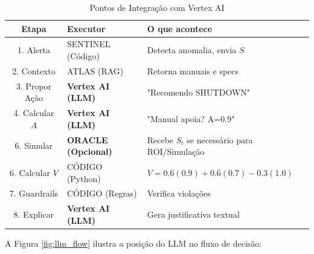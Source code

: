 \documentclass[12pt, a4paper]{article}
\begin{document}
\begin{table}[h!]
\centering
\small
\begin{tabular}{|c|l|l|}
\hline
\textbf{Etapa} & \textbf{Executor} & \textbf{O que acontece} \\ \hline
1. Alerta & SENTINEL (Código) & Detecta anomalia, envia $S$ \\ \hline
2. Contexto & ATLAS (RAG) & Retorna manuais e specs \\ \hline
3. Propor Ação & \textbf{Vertex AI (LLM)} & "Recomendo SHUTDOWN" \\ \hline
4. Calcular $A$ & \textbf{Vertex AI (LLM)} & "Manual apoia? A=0.9" \\ \hline
6. Simular & \textbf{ORACLE (Opcional)} & Recebe $S_t$ se necessário para ROI/Simulação \\ \hline
6. Calcular $V$ & CÓDIGO (Python) & $V = 0.6(0.9) + 0.6(0.7) - 0.3(1.0)$ \\ \hline
7. Guardrails & CÓDIGO (Regras) & Verifica violações \\ \hline
8. Explicar & \textbf{Vertex AI (LLM)} & Gera justificativa textual \\ \hline
\end{tabular}
\caption{Pontos de Integração com Vertex AI}
\end{table}

A Figura \ref{fig:llm_flow} ilustra a posição do LLM no fluxo de decisão:
\end{document}
